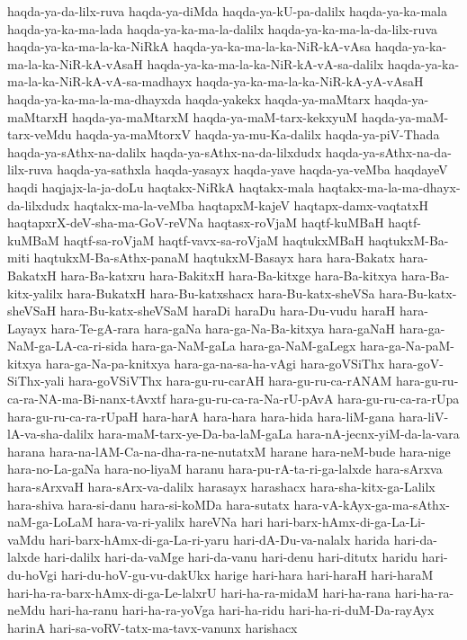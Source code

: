 {haqda-ya-da-lilx-ruva
haqda-ya-diMda
haqda-ya-kU-pa-dalilx
haqda-ya-ka-mala
haqda-ya-ka-ma-lada
haqda-ya-ka-ma-la-dalilx
haqda-ya-ka-ma-la-da-lilx-ruva
haqda-ya-ka-ma-la-ka-NiRkA
haqda-ya-ka-ma-la-ka-NiR-kA-vAsa
haqda-ya-ka-ma-la-ka-NiR-kA-vAsaH
haqda-ya-ka-ma-la-ka-NiR-kA-vA-sa-dalilx
haqda-ya-ka-ma-la-ka-NiR-kA-vA-sa-madhayx
haqda-ya-ka-ma-la-ka-NiR-kA-yA-vAsaH
haqda-ya-ka-ma-la-ma-dhayxda
haqda-yakekx
haqda-ya-maMtarx
haqda-ya-maMtarxH
haqda-ya-maMtarxM
haqda-ya-maM-tarx-kekxyuM
haqda-ya-maM-tarx-veMdu
haqda-ya-maMtorxV
haqda-ya-mu-Ka-dalilx
haqda-ya-piV-Thada
haqda-ya-sAthx-na-dalilx
haqda-ya-sAthx-na-da-lilxdudx
haqda-ya-sAthx-na-da-lilx-ruva
haqda-ya-sathxla
haqda-yasayx
haqda-yave
haqda-ya-veMba
haqdayeV
haqdi
haqjajx-la-ja-doLu
haqtakx-NiRkA
haqtakx-mala
haqtakx-ma-la-ma-dhayx-da-lilxdudx
haqtakx-ma-la-veMba
haqtapxM-kajeV
haqtapx-damx-vaqtatxH
haqtapxrX-deV-sha-ma-GoV-reVNa
haqtasx-roVjaM
haqtf-kuMBaH
haqtf-kuMBaM
haqtf-sa-roVjaM
haqtf-vavx-sa-roVjaM
haqtukxMBaH
haqtukxM-Ba-miti
haqtukxM-Ba-sAthx-panaM
haqtukxM-Basayx
hara
hara-Bakatx
hara-BakatxH
hara-Ba-katxru
hara-BakitxH
hara-Ba-kitxge
hara-Ba-kitxya
hara-Ba-kitx-yalilx
hara-BukatxH
hara-Bu-katxshacx
hara-Bu-katx-sheVSa
hara-Bu-katx-sheVSaH
hara-Bu-katx-sheVSaM
haraDi
haraDu
hara-Du-vudu
haraH
hara-Layayx
hara-Te-gA-rara
hara-gaNa
hara-ga-Na-Ba-kitxya
hara-gaNaH
hara-ga-NaM-ga-LA-ca-ri-sida
hara-ga-NaM-gaLa
hara-ga-NaM-gaLegx
hara-ga-Na-paM-kitxya
hara-ga-Na-pa-knitxya
hara-ga-na-sa-ha-vAgi
hara-goVSiThx
hara-goV-SiThx-yali
hara-goVSiVThx
hara-gu-ru-carAH
hara-gu-ru-ca-rANAM
hara-gu-ru-ca-ra-NA-ma-Bi-nanx-tAvxtf
hara-gu-ru-ca-ra-Na-rU-pAvA
hara-gu-ru-ca-ra-rUpa
hara-gu-ru-ca-ra-rUpaH
hara-harA
hara-hara
hara-hida
hara-liM-gana
hara-liV-lA-va-sha-dalilx
hara-maM-tarx-ye-Da-ba-laM-gaLa
hara-nA-jecnx-yiM-da-la-vara
harana
hara-na-lAM-Ca-na-dha-ra-ne-nutatxM
harane
hara-neM-bude
hara-nige
hara-no-La-gaNa
hara-no-liyaM
haranu
hara-pu-rA-ta-ri-ga-lalxde
hara-sArxva
hara-sArxvaH
hara-sArx-va-dalilx
harasayx
harashacx
hara-sha-kitx-ga-Lalilx
hara-shiva
hara-si-danu
hara-si-koMDa
hara-sutatx
hara-vA-kAyx-ga-ma-sAthx-naM-ga-LoLaM
hara-va-ri-yalilx
hareVNa
hari
hari-barx-hAmx-di-ga-La-Li-vaMdu
hari-barx-hAmx-di-ga-La-ri-yaru
hari-dA-Du-va-nalalx
harida
hari-da-lalxde
hari-dalilx
hari-da-vaMge
hari-da-vanu
hari-denu
hari-ditutx
haridu
hari-du-hoVgi
hari-du-hoV-gu-vu-dakUkx
harige
hari-hara
hari-haraH
hari-haraM
hari-ha-ra-barx-hAmx-di-ga-Le-lalxrU
hari-ha-ra-midaM
hari-ha-rana
hari-ha-ra-neMdu
hari-ha-ranu
hari-ha-ra-yoVga
hari-ha-ridu
hari-ha-ri-duM-Da-rayAyx
harinA
hari-sa-voRV-tatx-ma-tavx-vanunx
harishacx
}
